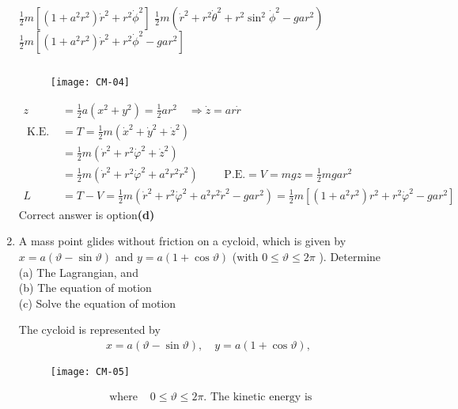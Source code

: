\begin{enumerate}
\begin{tasks}
		\task[\textbf{b.}] $\frac{1}{2} m\left[\left(1+a^{2} r^{2}\right) \dot{r}^{2}+r^{2} \dot{\phi}^{2}\right]$
		\task[\textbf{c.}]$\frac{1}{2} m\left(\dot{r}^{2}+r^{2} \dot{\theta}^{2}+r^{2} \sin ^{2} \dot{\phi}^{2}-g a r^{2}\right)$
		\task[\textbf{d.}]  $\frac{1}{2} m\left[\left(1+a^{2} r^{2}\right) \dot{r}^{2}+r^{2} \dot{\phi}^{2}-g a r^{2}\right]$
	\end{tasks}
	\begin{answer}$\left. \right. $
		\begin{figure}[H]
			\centering
			\texttt{[image: CM-04]}
		\end{figure}
		\begin{align*}
		z&=\frac{1}{2} a\left(x^{2}+y^{2}\right)=\frac{1}{2} a r^{2} \quad \Rightarrow \dot{z}=a r \dot{r}\\
	\text{	K.E. }&=T=\frac{1}{2} m\left(\dot{x}^{2}+\dot{y}^{2}+\dot{z}^{2}\right)\\
	&=\frac{1}{2} m\left(\dot{r}^{2}+r^{2} \dot{\varphi}^{2}+\dot{z}^{2}\right)\\
	&=\frac{1}{2} m\left(\dot{r}^{2}+r^{2} \dot{\varphi}^{2}+a^{2} r^{2} \dot{r}^{2}\right) \qquad\text{ P.E.} =V=m g z=\frac{1}{2} m g a r^{2}\\
	L&=T-V=\frac{1}{2} m\left(\dot{r}^{2}+r^{2} \dot{\varphi}^{2}+a^{2} r^{2} \dot{r}^{2}-g a r^{2}\right)=\frac{1}{2} m\left[\left(1+a^{2} r^{2}\right) r^{2}+r^{2} \dot{\varphi}^{2}-g a r^{2}\right]
		\end{align*}
		Correct answer is option\textbf{(d)}
	\end{answer}
	\item A mass point glides without friction on a cycloid, which is given by $x=a(\vartheta-\sin \vartheta)$ and $y=a(1+\cos \vartheta)$ (with $0 \leq \vartheta \leq 2 \pi$ ). Determine\\
	(a) The Lagrangian, and\\
	(b) The equation of motion\\
	(c) Solve the equation of motion
	\begin{answer}
		The cycloid is represented by
		\begin{align*}
		x=a(\vartheta-\sin \vartheta), \quad y=a(1+\cos \vartheta),
		\end{align*}
		\begin{figure}[H]
			\centering
			\texttt{[image: CM-05]}
		\end{figure}
		\begin{align*}
	\text{	where }&0 \leq \vartheta \leq 2 \pi.\text{ The kinetic energy is}\\

\end{align*}
\end{answer}
\end{enumerate}
